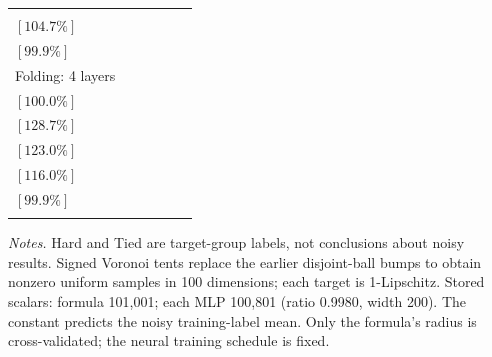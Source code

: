 \documentclass[10pt]{article}
\begin{document}
\begin{table}[t]
\begin{subtable}{\textwidth}
{\begin{tabular}{@{}lccccc@{}}
  \shortstack{$(1.258\pm 0.051)\times10^{-1}$\\$[104.7\%]$} &
  \shortstack{$(1.200\pm 0.036)\times10^{-1}$\\$[99.9\%]$} \\
\addlinespace[3pt]
Folding: 4 layers &
  \shortstack{$(4.225\pm 0.278)\times10^{-2}$\\$[100.0\%]$} &
  \shortstack{$(5.436\pm 0.261)\times10^{-2}$\\$[128.7\%]$} &
  \shortstack{$(5.198\pm 0.220)\times10^{-2}$\\$[123.0\%]$} &
  \shortstack{$(4.903\pm 0.264)\times10^{-2}$\\$[116.0\%]$} &
  \shortstack{$(4.219\pm 0.269)\times10^{-2}$\\$[99.9\%]$} \\
\addlinespace[3pt]
\bottomrule
\end{tabular}%
}
\end{subtable}
\par\smallskip
\begin{minipage}{\textwidth}
\footnotesize
\emph{Notes.} Hard and Tied are target-group labels, not conclusions about noisy results. Signed Voronoi tents replace the earlier disjoint-ball bumps to obtain nonzero uniform samples in 100 dimensions; each target is 1-Lipschitz. Stored scalars: formula 101,001; each MLP 100,801 (ratio 0.9980, width 200). The constant predicts the noisy training-label mean. Only the formula's radius is cross-validated; the neural training schedule is fixed.
\end{minipage}
\end{table}
\end{document}
